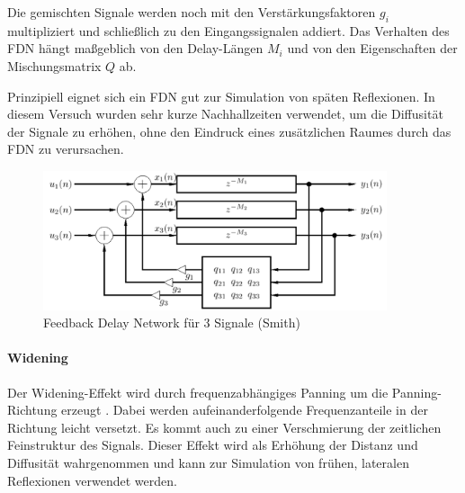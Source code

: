 Die gemischten Signale werden noch mit den Verstärkungsfaktoren $g_i$ multipliziert und schließlich zu den Eingangssignalen addiert. Das Verhalten des FDN hängt maßgeblich von den Delay-Längen $M_i$ und von den Eigenschaften der Mischungsmatrix $Q$ ab.

Prinzipiell eignet sich ein FDN gut zur Simulation von späten Reflexionen. In diesem Versuch wurden sehr kurze Nachhallzeiten verwendet, um die Diffusität der Signale zu erhöhen, ohne den Eindruck eines zusätzlichen Raumes durch das FDN zu verursachen.

\begin{figure}[!ht]
  \centering
  \includegraphics[width=0.9\textwidth]{dekorrelation/pic/FDN_smith.png}
  \caption{Feedback Delay Network für 3 Signale (Smith) \protect\footnotemark }
  \label{fig:fdn}
\end{figure}


\paragraph{Widening}
Der Widening-Effekt wird durch frequenzabhängiges Panning um die Panning-Richtung erzeugt \cite{ambi-book}. Dabei werden aufeinanderfolgende Frequenzanteile in der Richtung leicht versetzt. Es kommt auch zu einer Verschmierung der zeitlichen Feinstruktur des Signals. Dieser Effekt wird als Erhöhung der Distanz und Diffusität wahrgenommen und kann zur Simulation von frühen, lateralen Reflexionen verwendet werden.
